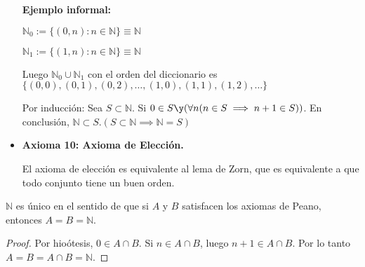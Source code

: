 \begin{itemize}
		 \textbf{Ejemplo informal:}
		 
		 $\mathbb{N}_0:=\{(0, n): n\in \mathbb{N}\}\equiv \mathbb{N}$
		 
		 $\mathbb{N}_1:=\{(1, n): n\in \mathbb{N}\}\equiv \mathbb{N}$
		 
		 Luego $\mathbb{N}_0\cup\mathbb{N}_1$ con el orden del diccionario es $\{(0,0), (0,1), (0,2), \hdots, (1,0),(1,1), (1,2), \hdots\}$
		 
		 Por inducción: Sea $S\subset\mathbb{N}$. Si $0\in S\y(\forall n(n\in S\implies n+1\in S))$. En conclusión, $\mathbb{N}\subset S. (S\subset \mathbb{N}\implies \mathbb{N}=S)$
		 
		 \item \textbf{Axioma 10: Axioma de Elección.}
		 
		 El axioma de elección es equivalente al lema de Zorn, que es equivalente a que todo conjunto tiene un buen orden.
	\end{itemize}
	
	\begin{theorem}
		$\mathbb{N}$ es único en el sentido de que si $A$ y $B$ satisfacen los axiomas de Peano, entonces $A=B=\mathbb{N}$. 
	\end{theorem}
	\begin{proof}
		Por hioótesis, $0\in A\cap B$.
		Si $n\in A\cap B$, luego $n+1\in A\cap B$. Por lo tanto $A=B=A\cap B=\mathbb{N}$.
	\end{proof}

